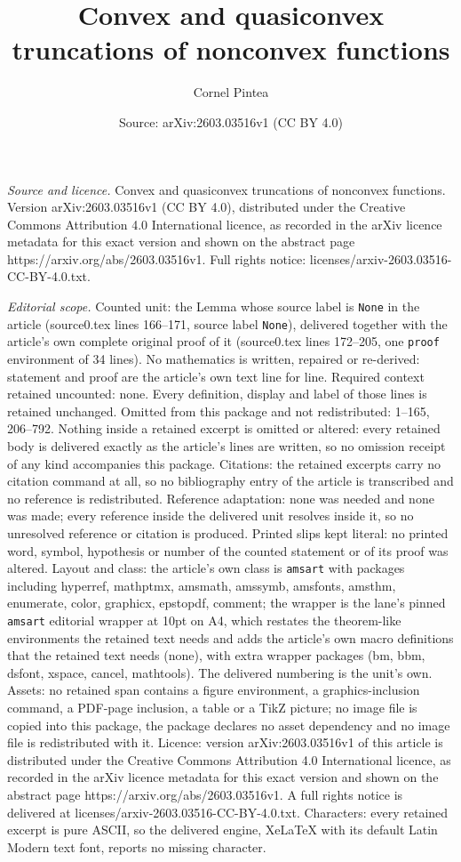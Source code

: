 \documentclass[10pt,a4paper]{amsart}
\title[Convex and quasiconvex truncations of nonconvex functions]{Convex and quasiconvex truncations of nonconvex functions}
\author{Cornel Pintea}
\date{Source: arXiv:2603.03516v1 (CC BY 4.0)}
\begin{document}
\maketitle

\noindent\emph{Source and licence.} Convex and quasiconvex truncations of nonconvex functions. Version arXiv:2603.03516v1 (CC BY 4.0), distributed under the Creative Commons Attribution 4.0 International licence, as recorded in the arXiv licence metadata for this exact version and shown on the abstract page https://arxiv.org/abs/2603.03516v1. Full rights notice: licenses/arxiv-2603.03516-CC-BY-4.0.txt.\par\smallskip

\noindent\textit{Editorial scope.} Counted unit: the Lemma whose source label is \texttt{None} in the article (source0.tex lines 166--171, source label \texttt{None}), delivered together with the article's own complete original proof of it (source0.tex lines 172--205, one \texttt{proof} environment of 34 lines). No mathematics is written, repaired or re-derived: statement and proof are the article's own text line for line. Required context retained uncounted: none. Every definition, display and label of those lines is retained unchanged. Omitted from this package and not redistributed: 1--165, 206--792. Nothing inside a retained excerpt is omitted or altered: every retained body is delivered exactly as the article's lines are written, so no omission receipt of any kind accompanies this package. Citations: the retained excerpts carry no citation command at all, so no bibliography entry of the article is transcribed and no reference is redistributed. Reference adaptation: none was needed and none was made; every reference inside the delivered unit resolves inside it, so no unresolved reference or citation is produced. Printed slips kept literal: no printed word, symbol, hypothesis or number of the counted statement or of its proof was altered. Layout and class: the article's own class is \texttt{amsart} with packages including hyperref, mathptmx, amsmath, amssymb, amsfonts, amsthm, enumerate, color, graphicx, epstopdf, comment; the wrapper is the lane's pinned \texttt{amsart} editorial wrapper at 10pt on A4, which restates the theorem-like environments the retained text needs and adds the article's own macro definitions that the retained text needs (none), with extra wrapper packages (bm, bbm, dsfont, xspace, cancel, mathtools). The delivered numbering is the unit's own. Assets: no retained span contains a figure environment, a graphics-inclusion command, a PDF-page inclusion, a table or a TikZ picture; no image file is copied into this package, the package declares no asset dependency and no image file is redistributed with it. Licence: version arXiv:2603.03516v1 of this article is distributed under the Creative Commons Attribution 4.0 International licence, as recorded in the arXiv licence metadata for this exact version and shown on the abstract page https://arxiv.org/abs/2603.03516v1. A full rights notice is delivered at licenses/arxiv-2603.03516-CC-BY-4.0.txt. Characters: every retained excerpt is pure ASCII, so the delivered engine, XeLaTeX with its default Latin Modern text font, reports no missing character.
\end{document}
